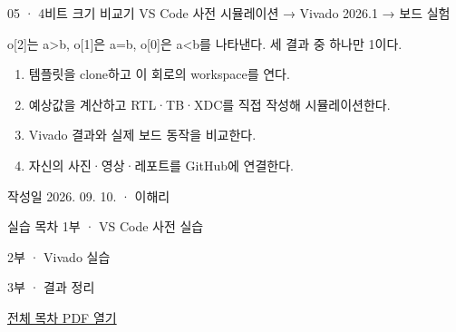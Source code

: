 
\renewcommand{\labonehome}{\hyperlink{modern-05-contents}{\contentsbutton}}
\renewcommand{\legacySource}[1]{}
\providecommand{\terminalbox}[1]{\par\vspace{0.15cm}{\setlength{\fboxsep}{7pt}\colorbox{black}{\parbox{\dimexpr\textwidth-14pt\relax}{\color{white}\ttfamily\fontsize{7}{9}\selectfont #1}}}\par\vspace{0.15cm}}

\begingroup
\renewcommand{\small}{\fontsize{9}{11}\selectfont}
\begin{frame}{05 · 4비트 크기 비교기}\relax
\small
VS Code 사전 시뮬레이션 → Vivado 2026.1 → 보드 실험\par\vspace{0.22cm}o[2]는 a>b, o[1]은 a=b, o[0]은 a<b를 나타낸다. 세 결과 중 하나만 1이다.\par\begin{enumerate}\setlength{\itemsep}{0.22cm}
\item 템플릿을 clone하고 이 회로의 workspace를 연다.
\item 예상값을 계산하고 RTL·TB·XDC를 직접 작성해 시뮬레이션한다.
\item Vivado 결과와 실제 보드 동작을 비교한다.
\item 자신의 사진·영상·레포트를 GitHub에 연결한다.
\end{enumerate}
작성일 2026. 09. 10. · 이해리\par
\end{frame}

\begin{frame}[label=modern-05-contents]{실습 목차}\relax
\small
1부 · VS Code 사전 실습\par{}\par\vspace{0.2cm}
\par\vspace{0.4cm}
2부 · Vivado 실습\par{}\par\vspace{0.4cm}
3부 · 결과 정리\par{}\par\vspace{0.35cm}
\href{04.LAB1_00_CONTENTS.pdf}{전체 목차 PDF 열기}
\end{frame}

